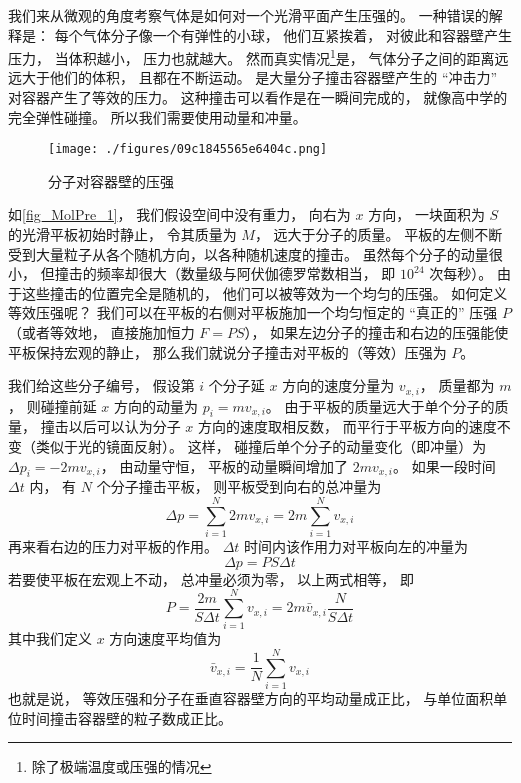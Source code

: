 

我们来从微观的角度考察气体是如何对一个光滑平面产生压强的。 一种错误的解释是： 每个气体分子像一个有弹性的小球， 他们互紧挨着， 对彼此和容器壁产生压力， 当体积越小， 压力也就越大。 然而真实情况\footnote{除了极端温度或压强的情况}是， 气体分子之间的距离远远大于他们的体积， 且都在不断运动。 是大量分子撞击容器壁产生的 “冲击力” 对容器产生了等效的压力。 这种撞击可以看作是在一瞬间完成的， 就像高中学的完全弹性碰撞。 所以我们需要使用动量和冲量。

\begin{figure}[ht]
\centering
\texttt{[image: ./figures/09c1845565e6404c.png]}
\caption{分子对容器壁的压强} \label{fig_MolPre_1}
\end{figure}

如\autoref{fig_MolPre_1}， 我们假设空间中没有重力， 向右为 $x$ 方向， 一块面积为 $S$ 的光滑平板初始时静止， 令其质量为 $M$， 远大于分子的质量。 平板的左侧不断受到大量粒子从各个随机方向，以各种随机速度的撞击。 虽然每个分子的动量很小， 但撞击的频率却很大（数量级与阿伏伽德罗常数相当， 即 $10^{24}$ 次每秒）。 由于这些撞击的位置完全是随机的， 他们可以被等效为一个均匀的压强。 如何定义等效压强呢？ 我们可以在平板的右侧对平板施加一个均匀恒定的 “真正的” 压强 $P$ （或者等效地， 直接施加恒力 $F = PS$）， 如果左边分子的撞击和右边的压强能使平板保持宏观的静止， 那么我们就说分子撞击对平板的（等效）压强为 $P$。

我们给这些分子编号， 假设第 $i$ 个分子延 $x$ 方向的速度分量为 $v_{x,i}$， 质量都为 $m$， 则碰撞前延 $x$ 方向的动量为 $p_i = m v_{x,i}$。 由于平板的质量远大于单个分子的质量， 撞击以后可以认为分子 $x$ 方向的速度取相反数， 而平行于平板方向的速度不变（类似于光的镜面反射）。 这样， 碰撞后单个分子的动量变化（即冲量）为 $\Delta p_i = -2mv_{x,i}$， 由动量守恒， 平板的动量瞬间增加了 $2mv_{x,i}$。 如果一段时间 $\Delta t$ 内， 有 $N$ 个分子撞击平板， 则平板受到向右的总冲量为
\begin{equation}
\Delta p = \sum_{i=1}^N 2mv_{x,i} = 2m \sum_{i=1}^N v_{x,i}
\end{equation}
再来看右边的压力对平板的作用。 $\Delta t$ 时间内该作用力对平板向左的冲量为
\begin{equation}\label{eq_MolPre_1}
\Delta p = PS \Delta t
\end{equation}
若要使平板在宏观上不动， 总冲量必须为零， 以上两式相等， 即
\begin{equation}
P = \frac{2m}{S\Delta t} \sum_{i=1}^N v_{x,i} = 2m\bar v_{x,i} \frac{N}{S\Delta t}
\end{equation}
其中我们定义 $x$ 方向速度平均值为
\begin{equation}\label{eq_MolPre_2}
\bar v_{x,i} = \frac{1}{N}\sum_{i=1}^N v_{x,i}
\end{equation}
也就是说， 等效压强和分子在垂直容器壁方向的平均动量成正比， 与单位面积单位时间撞击容器壁的粒子数成正比。

